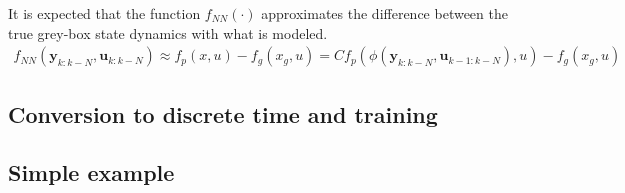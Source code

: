 \documentclass{article}
\begin{document}
It is expected that the function $f_{NN}(\cdot)$ approximates
the difference between the true grey-box state dynamics
with what is modeled. 
\begin{align*}
  f_{NN}(\mathbf{y}_{k:k-N}, \mathbf{u}_{k:k-N}) \approx 
      f_p(x, u) - f_g(x_g, u) = 
      Cf_p(\phi(\mathbf{y}_{k:k-N}, \mathbf{u}_{k-1:k-N}), u) - f_g(x_g, u)
\end{align*}  

\subsection{Conversion to discrete time and training}



\subsection{Simple example}



\end{document}
